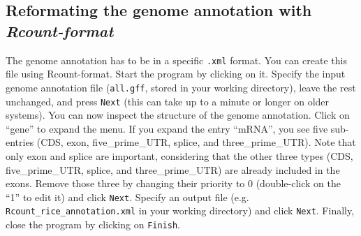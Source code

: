 \documentclass[a4paper,10pt]{article}
\begin{document}
\subsection{Reformating the genome annotation with \textit{Rcount-format}}
The genome annotation has to be in a specific \texttt{.xml} format. You can create this file using Rcount-format. Start the program by clicking on it. Specify the input genome annotation file (\texttt{all.gff}, stored in your working directory), leave the rest unchanged, and press \texttt{Next} (this can take up to a minute or longer on older systems). You can now inspect the structure of the genome annotation. Click on ``gene'' to expand the menu. If you expand the entry ``mRNA'', you see five sub-entries (CDS, exon, five\_prime\_UTR, splice, and three\_prime\_UTR). Note that only exon and splice are important, considering that the other three types (CDS, five\_prime\_UTR, splice, and three\_prime\_UTR) are already included in the exons. Remove those three by changing their priority to 0 (double-click on the ``1'' to edit it) and click \texttt{Next}. Specify an output file (e.g. \texttt{Rcount\_rice\_annotation.xml} in your working directory) and click \texttt{Next}. Finally, close the program by clicking on \texttt{Finish}.
\end{document}

